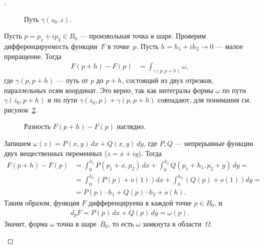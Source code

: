 \documentclass[../complex-analysis.tex]{subfiles}
\begin{document}
\begin{proof}[]
\begin{itemize}
   \begin{figure}[ht]
    \centering
    \caption{Путь $ \gamma(z_0, z) $.}
    \label{fig:parrallel_path_in_oblast}
   \end{figure}

   Пусть $ p = p_1 + ip_2 \in B_0 $ --- произвольная точка в шаре. Проверим дифференцируемость функции~$ F $ в точке~$ p $. Пусть $ h = h_1 + ih_2 \to 0 $ --- малое приращение. Тогда
   \begin{align*}
    F(p + h) - F(p) &= \int_{\gamma(p, p + h)}   \omega,
   \end{align*} где $ \gamma(p, p + h) $ --- путь от  $ p $  до $ p + h $, состоящий из двух отрезков, параллельных осям координат. Это верно, так как интегралы формы $ \omega $ по пути $ \gamma(z_0,p+h) $ и по пути $ \gamma(z_0, p) + \gamma(p,p+h) $ совпадают, для понимания см. рисунок~\ref{fig:differential_of_parallel_path_f}.

   \begin{figure}[ht]
    \centering
    \caption{Разность $ F(p+h) - F(p) $ наглядно.}
    \label{fig:differential_of_parallel_path_f}
   \end{figure}

   Запишем  $ \omega(z) = P(x,y)\,dx + Q(x,y)\,dy $, где  $ P,Q $ --- непрерывные функции двух вещественных переменных ($ z = x+iy $). Тогда
   \begin{align*}
    F(p+h)-F(p) &= \int_{0}^{h_1} P(p_1 + x, p_2)\,dx + \int_{0}^{h_2} Q(p_1 + h_1, p_2 + y)\,dy = \\
    &= \int_{0}^{h_1} \left( P(p) + o(1) \right)dx + \int_{0}^{h_2} \left( Q(p) + o(1) \right)dy = \\
    &= P(p) \cdot h_1 + Q(p) \cdot h_2 + o(h).
   \end{align*} Таким образом, функция $ F $ дифференцируема в каждой точке $ p \in B_0 $, и
   \begin{align*}
    d_p F = P(p)\,dx + Q(p)\,dy = \omega(p).
   \end{align*} Значит, форма $ \omega $ точна в шаре~$ B_0 $, то есть $ \omega $ замкнута в области~$ \Omega $.
 \end{itemize}
\end{proof}
\end{document}
